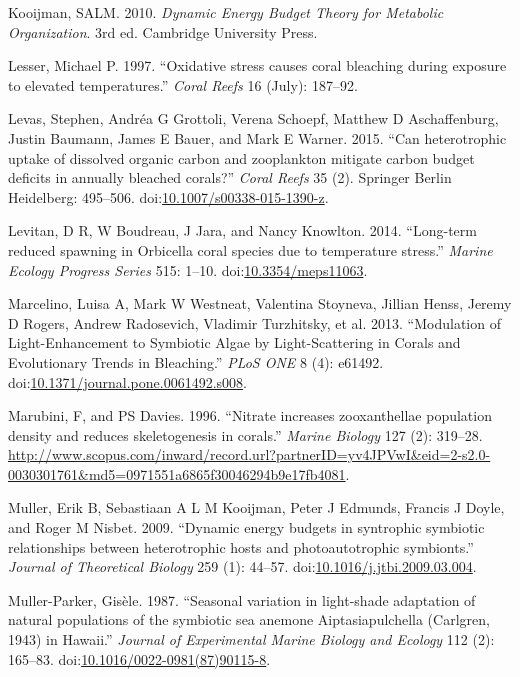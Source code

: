 \documentclass[]{elsarticle} %
\begin{document}
\hypertarget{ref-Kooijman:2010vd}{}
Kooijman, SALM. 2010. \emph{Dynamic Energy Budget Theory for Metabolic
Organization}. 3rd ed. Cambridge University Press.

\hypertarget{ref-Lesser:1997p3587}{}
Lesser, Michael P. 1997. ``Oxidative stress causes coral bleaching
during exposure to elevated temperatures.'' \emph{Coral Reefs} 16
(July): 187--92.

\hypertarget{ref-Levas:2015ic}{}
Levas, Stephen, Andréa G Grottoli, Verena Schoepf, Matthew D
Aschaffenburg, Justin Baumann, James E Bauer, and Mark E Warner. 2015.
``Can heterotrophic uptake of dissolved organic carbon and zooplankton
mitigate carbon budget deficits in annually bleached corals?''
\emph{Coral Reefs} 35 (2). Springer Berlin Heidelberg: 495--506.
doi:\href{https://doi.org/10.1007/s00338-015-1390-z}{10.1007/s00338-015-1390-z}.

\hypertarget{ref-Levitan:2014et}{}
Levitan, D R, W Boudreau, J Jara, and Nancy Knowlton. 2014. ``Long-term
reduced spawning in Orbicella coral species due to temperature stress.''
\emph{Marine Ecology Progress Series} 515: 1--10.
doi:\href{https://doi.org/10.3354/meps11063}{10.3354/meps11063}.

\hypertarget{ref-Marcelino:2013hz}{}
Marcelino, Luisa A, Mark W Westneat, Valentina Stoyneva, Jillian Henss,
Jeremy D Rogers, Andrew Radosevich, Vladimir Turzhitsky, et al. 2013.
``Modulation of Light-Enhancement to Symbiotic Algae by Light-Scattering
in Corals and Evolutionary Trends in Bleaching.'' \emph{PLoS ONE} 8 (4):
e61492.
doi:\href{https://doi.org/10.1371/journal.pone.0061492.s008}{10.1371/journal.pone.0061492.s008}.

\hypertarget{ref-Marubini:1996p8460}{}
Marubini, F, and PS Davies. 1996. ``Nitrate increases zooxanthellae
population density and reduces skeletogenesis in corals.'' \emph{Marine
Biology} 127 (2): 319--28.
\url{http://www.scopus.com/inward/record.url?partnerID=yv4JPVwI\&eid=2-s2.0-0030301761\&md5=0971551a6865f30046294b9e17fb4081}.

\hypertarget{ref-Muller:2009io}{}
Muller, Erik B, Sebastiaan A L M Kooijman, Peter J Edmunds, Francis J
Doyle, and Roger M Nisbet. 2009. ``Dynamic energy budgets in syntrophic
symbiotic relationships between heterotrophic hosts and photoautotrophic
symbionts.'' \emph{Journal of Theoretical Biology} 259 (1): 44--57.
doi:\href{https://doi.org/10.1016/j.jtbi.2009.03.004}{10.1016/j.jtbi.2009.03.004}.

\hypertarget{ref-MullerParker:1987cr}{}
Muller-Parker, Gisèle. 1987. ``Seasonal variation in light-shade
adaptation of natural populations of the symbiotic sea anemone
Aiptasiapulchella (Carlgren, 1943) in Hawaii.'' \emph{Journal of
Experimental Marine Biology and Ecology} 112 (2): 165--83.
doi:\href{https://doi.org/10.1016/0022-0981(87)90115-8}{10.1016/0022-0981(87)90115-8}.
\end{document}
